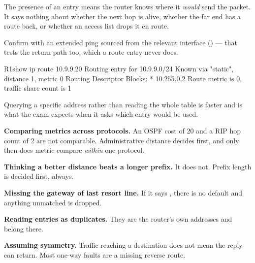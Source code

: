 \begin{alertbox}
The presence of an entry means the router knows where it \emph{would} send the
packet. It says nothing about whether the next hop is alive, whether the far end
has a route back, or whether an access list drops it en route.

Confirm with an extended ping sourced from the relevant interface
() --- that tests the return path too, which a route entry never
does.
\end{alertbox}

\begin{verify}{R1}{show ip route 10.9.9.20}
Routing entry for 10.9.9.0/24
  Known via "static", distance 1, metric 0
  Routing Descriptor Blocks:
  * 10.255.0.2
      Route metric is 0, traffic share count is 1
\end{verify}

Querying a specific address rather than reading the whole table is faster and is
what the exam expects when it asks which entry would be used.

\begin{pitfall}
\begin{tight}
  \item \textbf{Comparing metrics across protocols.} An OSPF cost of 20 and a RIP
        hop count of 2 are not comparable. Administrative distance decides first,
        and only then does metric compare \emph{within} one protocol.
  \item \textbf{Thinking a better distance beats a longer prefix.} It does not.
        Prefix length is decided first, always.
  \item \textbf{Missing the gateway of last resort line.} If it says
        , there is no default and anything unmatched is dropped.
  \item \textbf{Reading  entries as duplicates.} They are the router's own
        addresses and belong there.
  \item \textbf{Assuming symmetry.} Traffic reaching a destination does not mean
        the reply can return. Most one-way faults are a missing reverse route.
\end{tight}
\end{pitfall}


